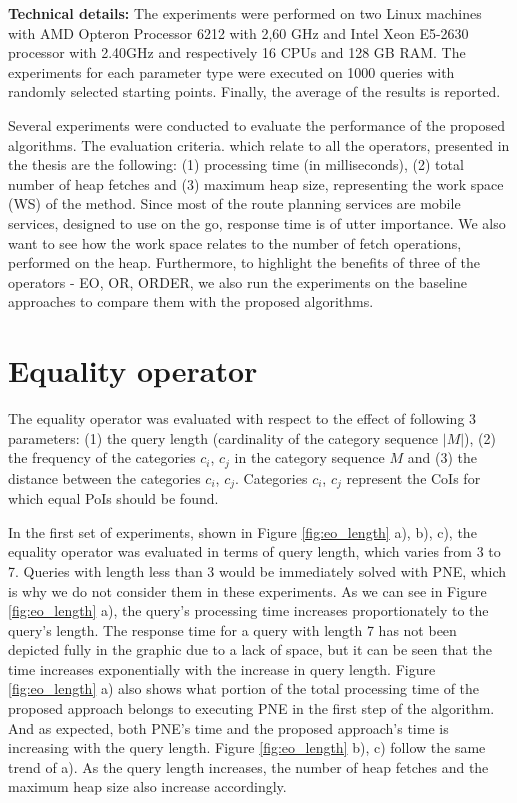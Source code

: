 \textbf{Technical details:}
The experiments were performed on two Linux machines with AMD Opteron Processor 6212 with 2,60 GHz and Intel Xeon E5-2630 processor with 2.40GHz and respectively 16 CPUs and 128 GB RAM. The experiments for each parameter type were executed on 1000 queries with randomly selected starting points. Finally, the average of the results is reported.

Several experiments were conducted to evaluate the performance of the proposed algorithms. The evaluation criteria. which relate to all the operators, presented in the thesis are the following: (1) processing time (in milliseconds), (2) total number of heap fetches and (3) maximum heap size, representing the work space (WS) of the method. Since most of the route planning services are mobile services, designed to use on the go, response time is of utter importance. We also want to see how the work space relates to the number of fetch operations, performed on the heap. Furthermore, to highlight the benefits of three of the operators - EO, OR, ORDER, we also run the experiments on the baseline approaches to compare them with the proposed algorithms. 

\section{Equality operator}
\label{sec:experimentsEO}

The equality operator was evaluated with respect to the effect of following 3 parameters: (1) the query length (cardinality of the category sequence $|M|$), (2) the frequency of the categories $c_i$, $c_j$ in the category sequence $M$ and (3) the distance between the categories $c_i$, $c_j$. Categories $c_i$, $c_j$ represent the CoIs for which equal PoIs should be found.

In the first set of experiments, shown in Figure \ref{fig:eo_length} a), b), c), the equality operator was evaluated in terms of query length, which varies from 3 to 7. Queries with length less than 3 would be immediately solved with PNE, which is why we do not consider them in these experiments. 
As we can see in Figure \ref{fig:eo_length} a), the query's processing time increases proportionately to the query's length. The response time for a query with length 7 has not been depicted fully in the graphic due to a lack of space, but it can be seen that the time increases exponentially with the increase in query length. Figure \ref{fig:eo_length} a) also shows what portion of the total processing time of the proposed approach belongs to executing PNE in the first step of the algorithm. And as expected, both PNE's time and the proposed approach's time is increasing with the query length.
Figure \ref{fig:eo_length} b), c) follow the same trend of a). As the query length increases, the number of heap fetches and the maximum heap size also increase accordingly.

